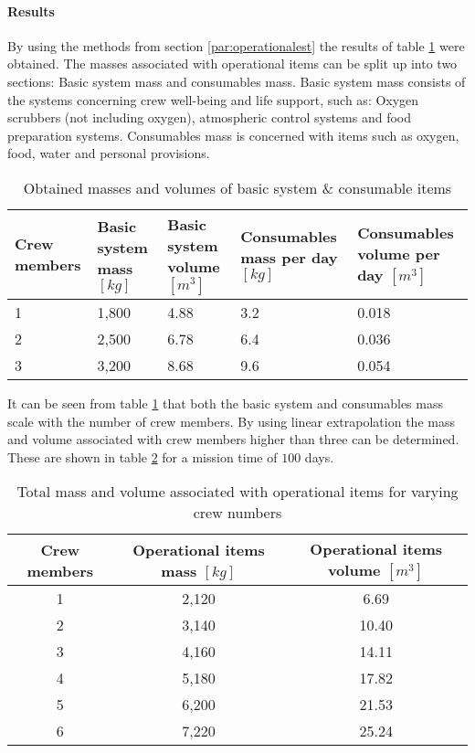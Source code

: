 \paragraph{Results}
By using the methods from section \ref{par:operationalest} the results of table \ref{tab:operationalest} were obtained.
The masses associated with operational items can be split up into two sections: Basic system mass and consumables mass. Basic system mass consists of the systems concerning crew well-being and life support, such as: Oxygen scrubbers (not including oxygen), atmospheric control systems and food preparation systems. Consumables mass is concerned with items such as oxygen, food, water and personal provisions.
\begin{table}[h]
	\centering
	\caption{Obtained masses and volumes of basic system \& consumable items}
	\begin{tabular}{|p{2cm}|p{2cm}|p{2cm}|p{2.5cm}|p{2.5cm}|}
		\hline
		\textbf{Crew members} & \textbf{Basic system mass $[kg]$} & \textbf{Basic system volume $[m^{3}]$} & \textbf{Consumables mass per day $[kg]$} & \textbf{Consumables volume per day $[m^{3}]$} \\ \hline \hline
		1 & 1,800 & 4.88 & 3.2 & 0.018 \\
		2 & 2,500 & 6.78 & 6.4 & 0.036 \\
		3 & 3,200 & 8.68 & 9.6 & 0.054 \\
		\hline
	\end{tabular}
	\label{tab:operationalest}
\end{table}
It can be seen from table \ref{tab:operationalest} that both the basic system and consumables mass scale with the number of crew members. By using linear extrapolation the mass and volume associated with crew members higher than three can be determined. These are shown in table \ref{tab:crewmemberops} for a mission time of $100$ days.\\

\begin{table}[h]
	\caption{Total mass and volume associated with operational items for varying crew numbers}
	\begin{tabular}{|c|c|c|}
		\hline
		\textbf{Crew members} & \textbf{Operational items mass $[kg]$} & \textbf{Operational items volume $[m^{3}]$}\\ \hline \hline
		1 & 2,120 & 6.69\\
		2 & 3,140 & 10.40\\
		3 & 4,160 & 14.11\\
		4 & 5,180 & 17.82\\
		5 & 6,200 & 21.53\\
		6 & 7,220 & 25.24\\ \hline
	\end{tabular}
	\label{tab:crewmemberops}
\end{table}